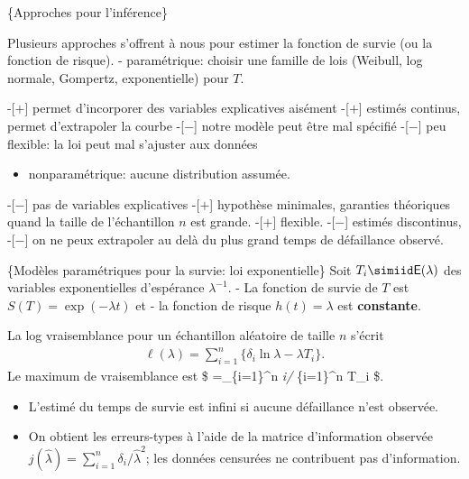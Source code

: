 \documentclass[
  11pt,
  letterpaper,
]{article}
\providecommand{\tightlist}{%
  \setlength{\itemsep}{0pt}\setlength{\parskip}{0pt}}
\theoremstyle{definition}
\theoremstyle{definition}
\theoremstyle{definition}
\theoremstyle{definition}
\theoremstyle{remark}
\begin{document}
\{Approches pour l'inférence\}

Plusieurs approches s'offrent à nous pour estimer la fonction de survie (ou la fonction de risque).
- paramétrique: choisir une famille de lois (Weibull, log normale, Gompertz, exponentielle) pour \(T\).

-{[}\(+\){]} permet d'incorporer des variables explicatives aisément
-{[}\(+\){]} estimés continus, permet d'extrapoler la courbe
-{[}\(-\){]} notre modèle peut être mal spécifié
-{[}\(-\){]} peu flexible: la loi peut mal s'ajuster aux données

\begin{itemize}
\tightlist
\item
  nonparamétrique: aucune distribution assumée.
\end{itemize}

-{[}\(-\){]} pas de variables explicatives
-{[}\(+\){]} hypothèse minimales, garanties théoriques quand la taille de l'échantillon \(n\) est grande.
-{[}\(+\){]} flexible.
-{[}\(-\){]} estimés discontinus,
-{[}\(-\){]} on ne peux extrapoler au delà du plus grand temps de défaillance observé.

\{Modèles paramétriques pour la survie: loi exponentielle\}
Soit \(T_i \simiid \mathsf{E}(\lambda)\) des variables exponentielles d'espérance \(\lambda^{-1}\).
-
La fonction de survie de \(T\) est \(S(T) = \exp(-\lambda t)\) et
- la fonction de risque \(h(t)=\lambda\) est \textbf{constante}.

La log vraisemblance pour un échantillon aléatoire de taille \(n\) s'écrit
\begin{align*}
\ell(\lambda) =\sum_{i=1}^n \{\delta_i \ln \lambda - \lambda T_i\}.
\end{align*}
Le maximum de vraisemblance est \$\widehat{\lambda} =\sum\_\{i=1\}\^{}n \delta\emph{i/ \sum}\{i=1\}\^{}n T\_i \$.

\begin{itemize}
\tightlist
\item
  L'estimé du temps de survie est infini si aucune défaillance n'est observée.
\item
  On obtient les erreurs-types à l'aide de la matrice d'information observée \(j(\widehat{\lambda}) = \sum_{i=1}^n \delta_i/\widehat{\lambda}^2\); les données censurées ne contribuent pas d'information.
\end{itemize}
\end{document}
